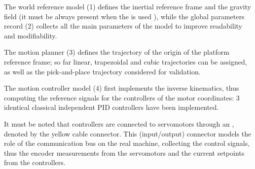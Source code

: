 \documentclass[]{interact}
\theoremstyle{plain}%
\theoremstyle{definition}
\theoremstyle{remark}
\begin{document}
The world reference model (1) defines the inertial reference frame and the gravity field (it must be always present when the  is used \cite{dlr11987}), while the global parameters record (2) collects all the main parameters of the model to improve readability and modifiability.

The motion planner (3) defines the trajectory of the origin of the platform reference frame; so far linear, trapezoidal and cubic trajectories can be assigned, as well as the pick-and-place trajectory considered for validation.

The motion controller model (4) first implements the inverse kinematics, thus computing the reference signals for the controllers of the motor coordinates: 3 identical classical independent PID controllers have been implemented.

It must be noted that controllers are connected to servomotors through an , denoted by the yellow cable connector. This (input/output) connector models the role of the communication bus on the real machine, collecting the control signals, thus the encoder measurements from the servomotors and the current setpoints from the controllers.
\end{document}
